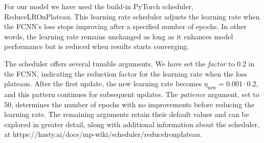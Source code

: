 \documentclass[a4paper, UKenglish, 11pt]{uiomaster}
\begin{document}
For our model we have used the build-in PyTorch scheduler, ReduceLROnPlateau. This learning rate scheduler adjusts the learning rate when the FCNN's loss stops improving after a specified number of epochs. In other words, the learning rate remains unchanged as long as it enhances model performance but is reduced when results starts converging.

The scheduler offers several tunable arguments. We have set the \emph{factor} to 0.2 in the FCNN, indicating the reduction factor for the learning rate when the loss plateaus. After the first update, the new learning rate becomes $\eta_{\text{new}} = 0.001 \cdot 0.2$, and this pattern continues for subsequent updates. The \emph{patience} argument, set to 50, determines the number of epochs with no improvements before reducing the learning rate. The remaining arguments retain their default values and can be explored in greater detail, along with additional information about the scheduler, at https://hasty.ai/docs/mp-wiki/scheduler/reducelronplateau.





\end{document}
